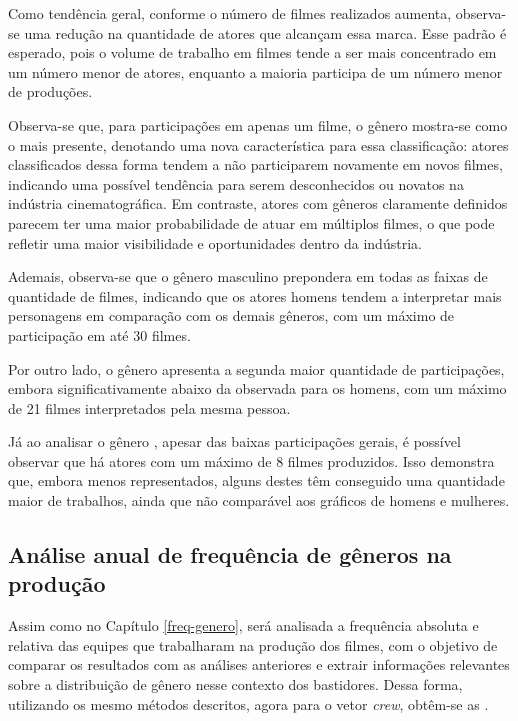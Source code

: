 %

Como tendência geral, conforme o número de filmes realizados aumenta, observa-se uma redução na quantidade de atores que alcançam essa marca. Esse padrão é esperado, pois o volume de trabalho em filmes tende a ser mais concentrado em um número menor de atores, enquanto a maioria participa de um número menor de produções.

Observa-se que, para participações em apenas um filme, o gênero  mostra-se como o mais presente, denotando uma nova característica para essa classificação: atores classificados dessa forma tendem a não participarem novamente em novos filmes, indicando uma possível tendência para serem desconhecidos ou novatos na indústria cinematográfica. Em contraste, atores com gêneros claramente definidos parecem ter uma maior probabilidade de atuar em múltiplos filmes, o que pode refletir uma maior visibilidade e oportunidades dentro da indústria.

Ademais, observa-se que o gênero masculino prepondera em todas as faixas de quantidade de filmes, indicando que os atores homens tendem a interpretar mais personagens em comparação com os demais gêneros, com um máximo de participação em até 30 filmes.

Por outro lado, o gênero  apresenta a segunda maior quantidade de participações, embora significativamente abaixo da observada para os homens, com um máximo de 21 filmes interpretados pela mesma pessoa.

Já ao analisar o gênero , apesar das baixas participações gerais, é possível observar que há atores com um máximo de 8 filmes produzidos. Isso demonstra que, embora menos representados, alguns destes têm conseguido uma quantidade maior de trabalhos, ainda que não comparável aos gráficos de homens e mulheres.

\subsection{Análise anual de frequência de gêneros na produção} \label{freq-genero-crew}
Assim como no Capítulo \ref{freq-genero}, será analisada a frequência absoluta e relativa das equipes que trabalharam na produção dos filmes, com o objetivo de comparar os resultados com as análises anteriores e extrair informações relevantes sobre a distribuição de gênero nesse contexto dos bastidores. Dessa forma, utilizando os mesmo métodos descritos, agora para o vetor \textit{crew}, obtêm-se as .

